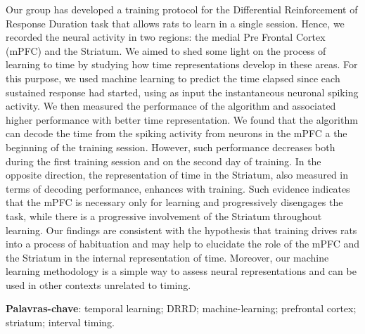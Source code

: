 
Our group has developed a training protocol for the Differential Reinforcement of Response Duration task that allows rats to learn in a single session. Hence, we recorded the neural activity in two regions: the medial Pre Frontal Cortex (mPFC) and the Striatum. We aimed to shed some light on the process of learning to time by studying how time representations develop in these areas. For this purpose, we used machine learning to predict the time elapsed since each sustained response had started, using as input the instantaneous neuronal spiking activity. We then measured the performance of the algorithm and associated higher performance with better time representation. We found that the algorithm can decode the time from the spiking activity from neurons in the mPFC a the beginning of the training session. However, such performance decreases both during the first training session and on the second day of training. In the opposite direction, the representation of time in the Striatum, also measured in terms of decoding performance, enhances with training. Such evidence indicates that the mPFC is necessary only for learning and progressively disengages the task, while there is a progressive involvement of the Striatum throughout learning. Our findings are consistent with the hypothesis that training drives rats into a process of habituation and may help to elucidate the role of the mPFC and the Striatum in the internal representation of time. Moreover, our machine learning methodology is a simple way to assess neural representations and can be used in other contexts unrelated to timing.

\textbf{Palavras-chave}: temporal learning; DRRD; machine-learning; prefrontal cortex; striatum; interval timing.